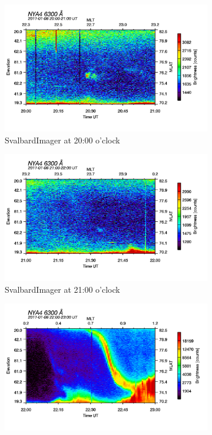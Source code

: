 \documentclass[10pt,a4paper]{article}
\begin{document}
\begin{figure}[h]
\begin{subfigure}{0.3\textwidth}
\end{subfigure}
\begin{subfigure}{0.3\textwidth}
\centering
	\includegraphics[width=\textwidth]{SvalbardImager6300A20.png}
	\caption{ SvalbardImager at 20:00 o'clock \label{SBI_6_20}}
\end{subfigure}
\begin{subfigure}{0.3\textwidth}
\centering
	\includegraphics[width=\textwidth]{SvalbardImager6300A21.png}
	\caption{ SvalbardImager at 21:00 o'clock \label{SBI_6_21}}
\end{subfigure}
\begin{subfigure}{0.3\textwidth}
\centering
		\includegraphics[width=\textwidth]{SvalbardImager6300A22.png}

\end{subfigure}
\end{figure}
\end{document}
